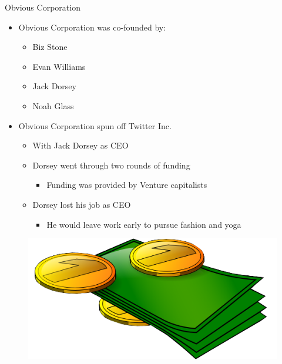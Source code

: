 \documentclass[xcolor=svgnames,handout]{beamer}
\begin{document}
\begin{frame}
{Obvious Corporation}
	\begin{itemize}
		\item Obvious Corporation was co-founded by:~\cite{markglaser2007}~\cite{patrickhoge2011}
			\begin{itemize}
				\item Biz Stone
				\item Evan Williams
				\item Jack Dorsey
				\item Noah Glass
			\end{itemize}
		\item Obvious Corporation spun off Twitter Inc.~\cite{markglaser2007}~\cite{patrickhoge2011}
			\begin{itemize}
				\item With Jack Dorsey as CEO
				\item Dorsey went through two rounds of funding
					\begin{itemize}
						\item Funding was provided by Venture capitalists~\cite{clairecainmillervindugoel2008}
					\end{itemize}
				\item Dorsey lost his job as CEO~\cite{kevinroose2013}
					\begin{itemize}
							\item He would leave work early to pursue fashion and yoga
					\end{itemize}
			\end{itemize}
	\end{itemize}
	\begin{figure}[h]
		\centering
		\includegraphics[scale=0.10]{bills_and_coins-edit.png}
		\caption{\cite{historicairUnknown}}
	\end{figure}
\end{frame}
\end{document}
